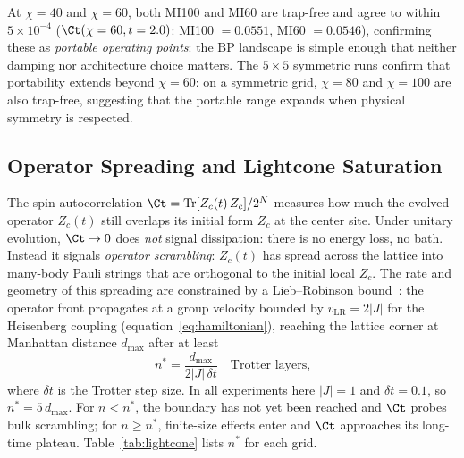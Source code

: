 At $\chi=40$ and $\chi=60$, both MI100 and MI60 are trap-free and agree to
within $5\times10^{-4}$ ($\Ct(\chi=60, t=2.0)$: MI100 $= 0.0551$,
MI60 $= 0.0546$), confirming these as \emph{portable operating points}: the BP
landscape is simple enough that neither damping nor architecture choice matters.
The $5\times5$ symmetric runs confirm that portability extends beyond
$\chi=60$: on a symmetric grid, $\chi=80$ and $\chi=100$ are also trap-free,
suggesting that the portable range expands when physical symmetry is respected.

\subsection{Operator Spreading and Lightcone Saturation}
\label{sec:lightcone}

The spin autocorrelation $\Ct = \mathrm{Tr}[Z_c(t)\,Z_c]/2^N$ measures how
much the evolved operator $Z_c(t)$ still overlaps its initial form $Z_c$ at
the center site.
Under unitary evolution, $\Ct \to 0$ does \emph{not} signal dissipation:
there is no energy loss, no bath.
Instead it signals \emph{operator scrambling}: $Z_c(t)$ has spread across
the lattice into many-body Pauli strings that are orthogonal to the initial
local $Z_c$.
The rate and geometry of this spreading are constrained by a Lieb--Robinson
bound~\citep{liebrobinson}: the operator front propagates at a group velocity
bounded by $v_{\mathrm{LR}} = 2|J|$ for the Heisenberg coupling
(equation~\eqref{eq:hamiltonian}), reaching the lattice corner at Manhattan
distance $d_{\mathrm{max}}$ after at least
\begin{equation}
  n^* = \frac{d_{\mathrm{max}}}{2|J|\,\delta t}
  \quad \text{Trotter layers,}
  \label{eq:nstar}
\end{equation}
where $\delta t$ is the Trotter step size.
In all experiments here $|J| = 1$ and $\delta t = 0.1$, so
$n^* = 5\,d_{\mathrm{max}}$.
For $n < n^*$, the boundary has not yet been reached and $\Ct$ probes
bulk scrambling; for $n \geq n^*$, finite-size effects enter and $\Ct$
approaches its long-time plateau.
Table~\ref{tab:lightcone} lists $n^*$ for each grid.

